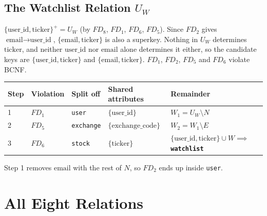 \documentclass{article}
\newcommand{\at}[1]{\text{#1}}
\newcommand{\cl}[1]{\{#1\}^+}
\begin{document}
\subsection{The Watchlist Relation $U_W$}

$\cl{\at{user\_id}, \at{ticker}} = U_W$ (by $FD_8$, $FD_1$, $FD_6$, $FD_5$). Since $FD_2$ gives $\at{email} \rightarrow \at{user\_id}$, $\{\at{email}, \at{ticker}\}$ is also a superkey. Nothing in $U_W$ determines $\at{ticker}$, and neither $\at{user\_id}$ nor $\at{email}$ alone determines it either, so the candidate keys are $\{\at{user\_id}, \at{ticker}\}$ and $\{\at{email}, \at{ticker}\}$. $FD_1$, $FD_2$, $FD_5$ and $FD_6$ violate BCNF.
\begin{center}
\begin{tabular}{l l l l l}
  \toprule
  \textbf{Step} & \textbf{Violation} & \textbf{Split off} & \textbf{Shared attributes} & \textbf{Remainder} \\
  \midrule
  1 & $FD_1$ & \texttt{user} & $\{\at{user\_id}\}$ & $W_1 = U_W \setminus N$ \\
  2 & $FD_5$ & \texttt{exchange} & $\{\at{exchange\_code}\}$ & $W_2 = W_1 \setminus E$ \\
  3 & $FD_6$ & \texttt{stock} & $\{\at{ticker}\}$ & $\{\at{user\_id}, \at{ticker}\} \cup W \implies$ \textbf{\texttt{watchlist}} \\
  \bottomrule
\end{tabular}
\end{center}
Step 1 removes $\at{email}$ with the rest of $N$, so $FD_2$ ends up inside \texttt{user}.

\section{All Eight Relations}
\end{document}

